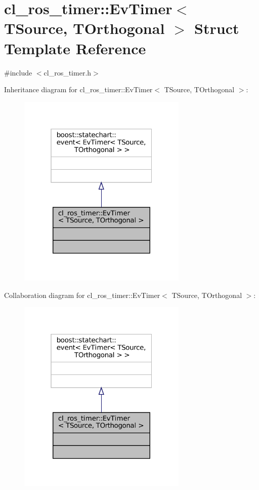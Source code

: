 \hypertarget{structcl__ros__timer_1_1EvTimer}{}\section{cl\+\_\+ros\+\_\+timer\+:\+:Ev\+Timer$<$ T\+Source, T\+Orthogonal $>$ Struct Template Reference}
\label{structcl__ros__timer_1_1EvTimer}


{\ttfamily \#include $<$cl\+\_\+ros\+\_\+timer.\+h$>$}



Inheritance diagram for cl\+\_\+ros\+\_\+timer\+:\+:Ev\+Timer$<$ T\+Source, T\+Orthogonal $>$\+:
\nopagebreak
\begin{figure}[H]
\begin{center}
\leavevmode
\includegraphics[width=229pt]{structcl__ros__timer_1_1EvTimer__inherit__graph}
\end{center}
\end{figure}


Collaboration diagram for cl\+\_\+ros\+\_\+timer\+:\+:Ev\+Timer$<$ T\+Source, T\+Orthogonal $>$\+:
\nopagebreak
\begin{figure}[H]
\begin{center}
\leavevmode
\includegraphics[width=229pt]{structcl__ros__timer_1_1EvTimer__coll__graph}
\end{center}
\end{figure}


